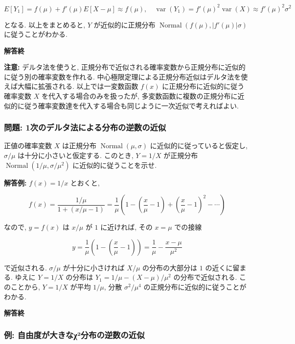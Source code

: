\documentclass[10pt, a4paper,xelatex,ja=standard]{bxjsarticle}
\newcommand\op{\operatorname}
\begin{document}
\[
E[Y_1] = f(\mu) + f'(\mu)E[X-\mu] \approx f(\mu), \quad
\op{var}(Y_1) = f'(\mu)^2\op{var}(X) \approx f'(\mu)^2\sigma^2
\]

となる. 以上をまとめると, \(Y\) が近似的に正規分布
\(\op{Normal}(f(\mu), |f'(\mu)|\sigma)\) に従うことがわかる.

\textbf{解答終}

\textbf{注意:} デルタ法を使うと,
正規分布で近似される確率変数から正規分布に近似的に従う別の確率変数を作れる.
中心極限定理による正規分布近似はデルタ法を使えば大幅に拡張される.
以上では一変数函数 \(f(x)\) に正規分布に近似的に従う確率変数 \(X\)
を代入する場合のみを扱ったが,
多変数函数に複数の正規分布に近似的に従う確率変数達を代入する場合も同じように一次近似で考えればよい.

    \hypertarget{ux554fux984c-1ux6b21ux306eux30c7ux30ebux30bfux6cd5ux306bux3088ux308bux5206ux5e03ux306eux9006ux6570ux306eux8fd1ux4f3c}{%
\subsubsection{問題:
1次のデルタ法による分布の逆数の近似}\label{ux554fux984c-1ux6b21ux306eux30c7ux30ebux30bfux6cd5ux306bux3088ux308bux5206ux5e03ux306eux9006ux6570ux306eux8fd1ux4f3c}}

正値の確率変数 \(X\) は正規分布 \(\op{Normal}(\mu, \sigma)\)
に近似的に従っていると仮定し, \(\sigma/\mu\) は十分に小さいと仮定する.
このとき, \(Y = 1/X\) が正規分布 \(\op{Normal}(1/\mu, \sigma/\mu^2)\)
に近似的に従うことを示せ.

\textbf{解答例:} \(f(x)=1/x\) とおくと,

\[
f(x) = \frac{1/\mu}{1 + (x/\mu - 1)} =
\frac{1}{\mu}\left(1 - \left(\frac{x}{\mu}-1\right) + \left(\frac{x}{\mu}-1\right)^2 - \cdots\right)
\]

なので, \(y = f(x)\) は \(x/\mu\) が \(1\) に近ければ, その \(x=\mu\)
での接線

\[
y =
\frac{1}{\mu}\left(1 - \left(\frac{x}{\mu}-1\right)\right) =
\frac{1}{\mu} - \frac{x - \mu}{\mu^2}
\]

で近似される. \(\sigma/\mu\) が十分に小さければ \(X/\mu\)
の分布の大部分は \(1\) の近くに留まる. ゆえに \(Y=1/X\) の分布は
\(Y_1 = 1/\mu - (X-\mu)/\mu^2\) の分布で近似される. このことから,
\(Y=1/X\) が平均 \(1/\mu\), 分散 \(\sigma^2/\mu^4\)
の正規分布に近似的に従うことがわかる.

\textbf{解答終}

    \hypertarget{ux4f8b-ux81eaux7531ux5ea6ux304cux5927ux304dux306aux3c7uxb2ux5206ux5e03ux306eux9006ux6570ux306eux8fd1ux4f3c}{%
\subsubsection{例:
自由度が大きなχ²分布の逆数の近似}\label{ux4f8b-ux81eaux7531ux5ea6ux304cux5927ux304dux306aux3c7uxb2ux5206ux5e03ux306eux9006ux6570ux306eux8fd1ux4f3c}}
\end{document}

